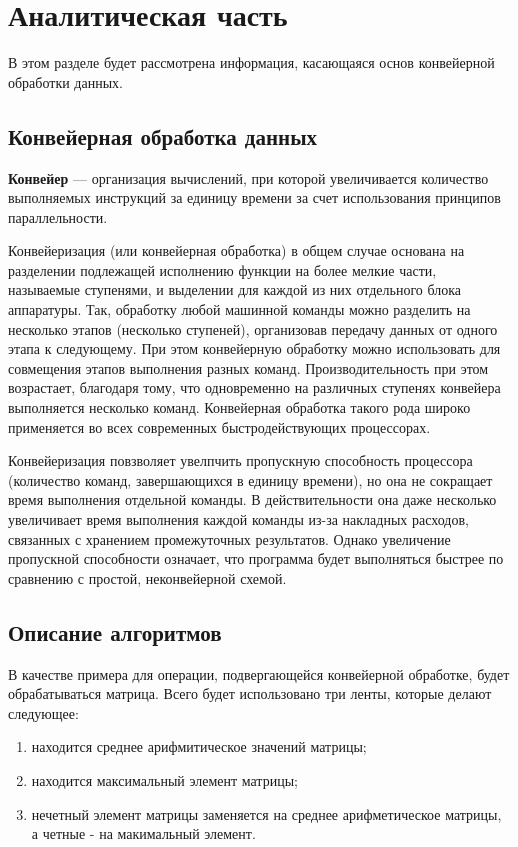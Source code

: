 \chapter{Аналитическая часть}
В этом разделе будет рассмотрена информация, касающаяся основ конвейерной обработки данных.

\section{Конвейерная обработка данных}
\textbf{Конвейер} \cite{conway}  --- организация вычислений, при которой увеличивается количество выполняемых инструкций за единицу времени за счет использования принципов параллельности.

Конвейеризация (или конвейерная обработка) в общем случае основана на разделении подлежащей исполнению функции на более мелкие части, называемые ступенями, и выделении для каждой из них отдельного блока аппаратуры. 
Так, обработку любой машинной команды можно разделить на несколько этапов (несколько ступеней), организовав передачу данных от одного этапа к следующему. 
При этом конвейерную обработку можно использовать для совмещения этапов выполнения разных команд. 
Производительность при этом возрастает, благодаря тому, что одновременно на различных ступенях конвейера выполняется несколько команд. 
Конвейерная обработка такого рода широко применяется во всех современных быстродействующих процессорах.


Конвейеризация повзволяет увелпчить пропускную способность процессора (количество команд, завершающихся в единицу времени), но она не сокращает время выполнения отдельной команды. 
В действительности она даже несколько увеличивает время выполнения каждой команды из-за накладных расходов, связанных с хранением промежуточных результатов. 
Однако увеличение пропускной способности означает, что программа будет выполняться быстрее по сравнению с простой, неконвейерной схемой.


\section{Описание алгоритмов}

В качестве примера для операции, подвергающейся конвейерной обработке, будет обрабатываться матрица. 
Всего будет использовано три ленты, которые делают следующее:

\begin{enumerate}[label=\arabic*)]
	\item находится среднее арифмитическое значений матрицы;
	\item находится максимальный элемент матрицы;
	\item нечетный элемент матрицы заменяется на среднее арифметическое матрицы, а четные - на макимальный элемент.
\end{enumerate}



